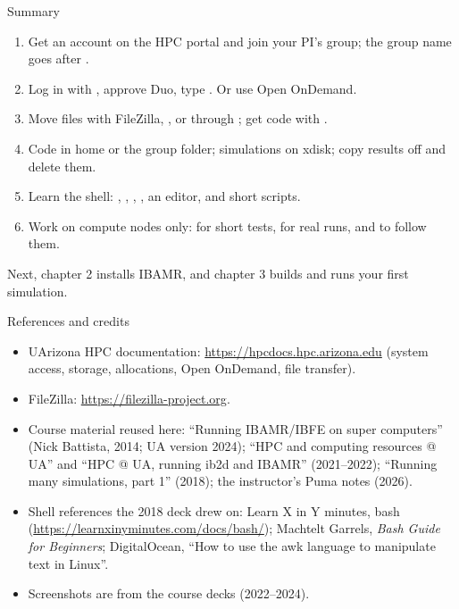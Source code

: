 \documentclass[aspectratio=169,11pt]{beamer}
\begin{document}
\begin{frame}{Summary}
\begin{enumerate}\small
  \item Get an account on the HPC portal and join your PI's group; the group name goes after .
  \item Log in with , approve Duo, type . Or use Open OnDemand.
  \item Move files with FileZilla, ,  or  through ; get code with .
  \item Code in home or the group folder; simulations on xdisk; copy results off and delete them.
  \item Learn the shell: , , , , an editor, and short scripts.
  \item Work on compute nodes only:  for short tests,  for real runs,  and  to follow them.
\end{enumerate}
\vspace{2mm}
\begin{homebox}
\small Next, chapter 2 installs IBAMR, and chapter 3 builds and runs your first simulation.
\end{homebox}
\end{frame}

\begin{frame}{References and credits}
\small
\begin{itemize}
  \item UArizona HPC documentation: \url{https://hpcdocs.hpc.arizona.edu} (system access, storage, allocations, Open OnDemand, file transfer).
  \item FileZilla: \url{https://filezilla-project.org}.
  \item Course material reused here: ``Running IBAMR/IBFE on super computers'' (Nick Battista, 2014; UA version 2024); ``HPC and computing resources @ UA'' and ``HPC @ UA, running ib2d and IBAMR'' (2021--2022); ``Running many simulations, part 1'' (2018); the instructor's Puma notes (2026).
  \item Shell references the 2018 deck drew on: Learn X in Y minutes, bash (\url{https://learnxinyminutes.com/docs/bash/}); Machtelt Garrels, \emph{Bash Guide for Beginners}; DigitalOcean, ``How to use the awk language to manipulate text in Linux''.
  \item Screenshots are from the course decks (2022--2024).
\end{itemize}
\end{frame}
\end{document}
